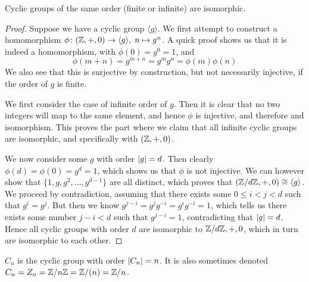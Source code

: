 \begin{theorem}
    Cyclic groups of the same order (finite or infinite) are isomorphic.
\end{theorem}
\begin{proof}
    Suppose we have a cyclic group \(\langle g \rangle\).
    We first attempt to construct a homomorphism
    \(\phi\colon(\mathbb{Z},+,0)\to\langle g \rangle,\;n\mapsto g^n\).
    A quick proof shows us that it is indeed a homomorphism,
    with \(\phi(0) = g^0 = 1\), and
    \begin{equation*}
        \phi(m+n) = g^{m+n} = g^m g^n = \phi(m)\phi(n)
    \end{equation*}
    We also see that this is surjective by construction,
    but not necessarily injective,
    if the order of \(g\) is finite.

    We first consider the case of infinite order of \(g\).
    Then it is clear that no two integers will map to the same element,
    and hence \(\phi\) is injective, and therefore and isomorphism.
    This proves the part where we claim that
    all infinite cyclic groups are isomorphic,
    and specifically with \((\mathbb{Z},+,0)\).

    We now consider some \(g\) with order \(\abs{g} = d\).
    Then clearly \(\phi(d) = \phi(0) = g^d = 1\),
    which shows us that \(\phi\) is not injective.
    We can however show that \(\{1,g,g^2,\hdots,g^{d-1}\}\)
    are all distinct,
    which proves that \((\mathbb{Z}/d\mathbb{Z},+,0) \cong \langle g \rangle\).
    We proceed by contradiction,
    assuming that there exists some \(0 \leq i < j < d\)
    such that \(g^i = g^j\).
    But then we know \(g^{j-i} = g^j g^{-i} = g^i g^{-i} = 1\),
    which tells us there exists some number \(j-i < d\)
    such that \(g^{j-i} = 1\),
    contradicting that \(\abs{g} = d\).
    Hence all cyclic groups with order \(d\)
    are isomorphic to \(\mathbb{Z}/d\mathbb{Z},+,0\),
    which in turn are isomorphic to each other.
\end{proof}

\begin{definition}
    \(C_n\) is the cyclic group with order \(\abs{C_n} = n\).
    It is also sometimes denoted \(C_n = Z_n = \mathbb{Z}/n\mathbb{Z} = \mathbb{Z}/(n) = \mathbb{Z}/n\).
\end{definition}

